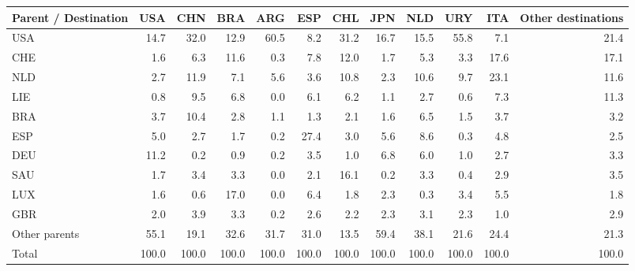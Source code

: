 \begin{tabular}{lrrrrrrrrrrr}
\toprule
Parent / Destination & USA & CHN & BRA & ARG & ESP & CHL & JPN & NLD & URY & ITA & Other destinations \\
\midrule
USA & 14.7 & 32.0 & 12.9 & 60.5 & 8.2 & 31.2 & 16.7 & 15.5 & 55.8 & 7.1 & 21.4 \\
CHE & 1.6 & 6.3 & 11.6 & 0.3 & 7.8 & 12.0 & 1.7 & 5.3 & 3.3 & 17.6 & 17.1 \\
NLD & 2.7 & 11.9 & 7.1 & 5.6 & 3.6 & 10.8 & 2.3 & 10.6 & 9.7 & 23.1 & 11.6 \\
LIE & 0.8 & 9.5 & 6.8 & 0.0 & 6.1 & 6.2 & 1.1 & 2.7 & 0.6 & 7.3 & 11.3 \\
BRA & 3.7 & 10.4 & 2.8 & 1.1 & 1.3 & 2.1 & 1.6 & 6.5 & 1.5 & 3.7 & 3.2 \\
ESP & 5.0 & 2.7 & 1.7 & 0.2 & 27.4 & 3.0 & 5.6 & 8.6 & 0.3 & 4.8 & 2.5 \\
DEU & 11.2 & 0.2 & 0.9 & 0.2 & 3.5 & 1.0 & 6.8 & 6.0 & 1.0 & 2.7 & 3.3 \\
SAU & 1.7 & 3.4 & 3.3 & 0.0 & 2.1 & 16.1 & 0.2 & 3.3 & 0.4 & 2.9 & 3.5 \\
LUX & 1.6 & 0.6 & 17.0 & 0.0 & 6.4 & 1.8 & 2.3 & 0.3 & 3.4 & 5.5 & 1.8 \\
GBR & 2.0 & 3.9 & 3.3 & 0.2 & 2.6 & 2.2 & 2.3 & 3.1 & 2.3 & 1.0 & 2.9 \\
Other parents & 55.1 & 19.1 & 32.6 & 31.7 & 31.0 & 13.5 & 59.4 & 38.1 & 21.6 & 24.4 & 21.3 \\
\midrule
Total & 100.0 & 100.0 & 100.0 & 100.0 & 100.0 & 100.0 & 100.0 & 100.0 & 100.0 & 100.0 & 100.0 \\
\bottomrule
\end{tabular}
